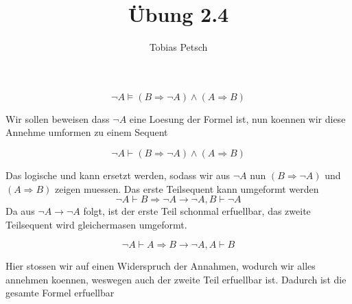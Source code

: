 \documentclass[a4paper,12pt]{article}
\title{Übung 2.4}
\author{Tobias Petsch}
\date{}
\begin{document}
\maketitle

\[
\neg A \models (B \Rightarrow \neg A) \land (A \Rightarrow B)
\]

Wir sollen beweisen dass $\neg A$ eine Loesung der Formel ist, nun koennen wir diese Annehme umformen zu einem Sequent

\[
\neg A \vdash (B \Rightarrow \neg A) \land (A \Rightarrow B)
\]

Das logische und kann ersetzt werden, sodass wir aus $\neg A$ nun $(B \Rightarrow \neg A)$ und $(A \Rightarrow B)$
zeigen muessen. Das erste Teilsequent kann umgeformt werden \\
\[
\neg A \vdash B \Rightarrow \neg A \rightarrow \neg A,B \vdash \neg A
\] 
Da aus $\neg A \rightarrow \neg A$ folgt, ist der erste Teil schonmal erfuellbar, das zweite Teilsequent wird gleichermasen umgeformt.

\[
\neg A \vdash A \Rightarrow B \rightarrow \neg A,A \vdash B
\]

Hier stossen wir auf einen Widerspruch der Annahmen, wodurch wir alles annehmen koennen, weswegen auch der zweite Teil erfuellbar ist.
Dadurch ist die gesamte Formel erfuellbar

\end{document}
